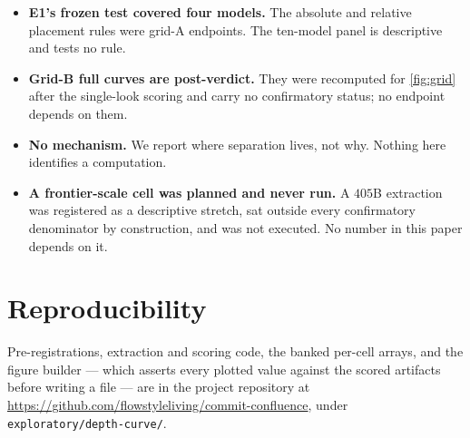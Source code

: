 \documentclass[10pt, letterpaper]{article}
\begin{document}
\begin{itemize}[leftmargin=1.4em, itemsep=0.2em]
    number, and the three that did not are not a random sample: two are the same model
    failing the same instrument boundary. The endpoint counts them as failures, which
    is conservative, but the surviving nine are not an unbiased draw.
  \item \textbf{E1's frozen test covered four models.} The absolute and relative
    placement rules were grid-A endpoints. The ten-model panel is descriptive and
    tests no rule.
  \item \textbf{Grid-B full curves are post-verdict.} They were recomputed for
    \cref{fig:grid} after the single-look scoring and carry no confirmatory status;
    no endpoint depends on them.
  \item \textbf{No mechanism.} We report where separation lives, not why. Nothing
    here identifies a computation.
  \item \textbf{A frontier-scale cell was planned and never run.} A
    $405$B extraction was registered as a descriptive stretch, sat outside every
    confirmatory denominator by construction, and was not executed. No number in
    this paper depends on it.
\end{itemize}

\section*{Reproducibility}
Pre-registrations, extraction and scoring code, the banked per-cell arrays, and
the figure builder --- which asserts every plotted value against the scored
artifacts before writing a file --- are in the project repository at
\url{https://github.com/flowstyleliving/commit-confluence}, under
\texttt{exploratory/depth-curve/}.
\end{document}
